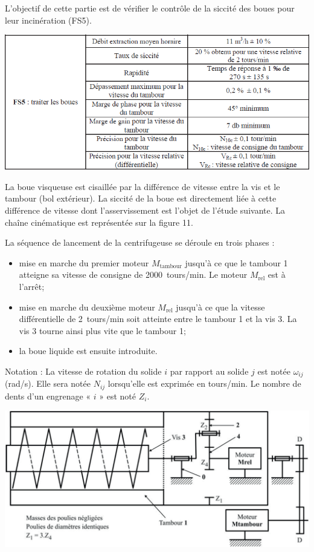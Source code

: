 \documentclass[10pt,fleqn]{article} %
\newif\ifcolle
\begin{document}
\begin{multicols}{2}
\fi

\begin{obj}
L’objectif de cette partie est de vérifier le contrôle de la siccité des boues pour leur incinération
(FS5).
\end{obj}

\begin{center}
\includegraphics[width=\linewidth]{images/fig_07}
\end{center}


\ifcolle
\else 
La boue visqueuse est cisaillée par la différence de vitesse entre la vis et le tambour (bol extérieur).
La siccité de la boue est directement liée à cette différence de vitesse dont
l’asservissement est l’objet de l’étude suivante. La chaîne cinématique est représentée sur la figure
11.

La séquence de lancement de la centrifugeuse se déroule en trois phases :
\begin{itemize}
\item mise en marche du premier moteur $M_{\text{tambour}}$ jusqu’à ce que le tambour 1 atteigne sa vitesse
de consigne de \SI{2 000}{tours/min}. Le moteur $M_{\text{rel}}$ est à l’arrêt;
\item mise en marche du deuxième moteur $M_{\text{rel}}$ jusqu’à ce que la vitesse différentielle de
\SI{2}{tours/min} soit atteinte entre le tambour 1 et la vis 3. La vis 3 tourne ainsi plus vite que le
tambour 1;
\item la boue liquide est ensuite introduite.
\end{itemize}

Notation : La vitesse de rotation du solide $i$ par rapport au solide $j$ est notée $\omega_{ij}$ (rad/s). Elle sera
notée $N_{ij}$ lorsqu’elle est exprimée en tours/min. Le nombre de dents d’un engrenage « $i$ » est noté $Z_i$.


\begin{center}
\includegraphics[width=\linewidth]{images/fig_02}
\end{center}


\end{multicols}
\end{document}
